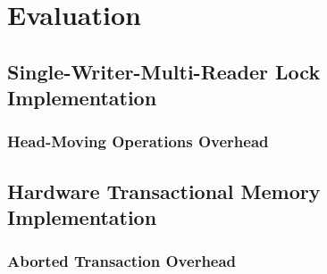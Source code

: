 
\section{Evaluation}

\subsection{Single-Writer-Multi-Reader Lock Implementation}

\subsubsection{Head-Moving Operations Overhead}

\subsection{Hardware Transactional Memory Implementation}

\subsubsection{Aborted Transaction Overhead}